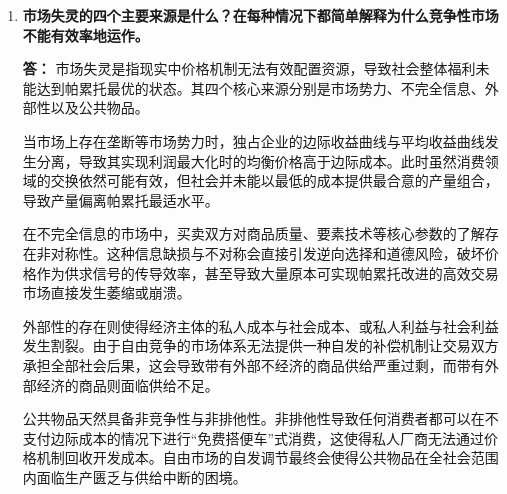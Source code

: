 \begin{enumerate}[label=\textbf{\arabic*.}, leftmargin=*]
		对于第四种陈述，表示不同意。生产 1 码布的机会成本是 3 蒲式耳小麦，意味着在劳动投入总量固定的约束下，多生产 1 码布所消耗的劳动力资源足以生产 3 蒲式耳小麦。因此，生产 1 码布所需的劳动投入在数值上应当是生产 1 蒲式耳小麦所需劳动投入的 3 倍。
		
		\item \textbf{市场失灵的四个主要来源是什么？在每种情况下都简单解释为什么竞争性市场不能有效率地运作。}
		
		\textbf{答：}
		市场失灵是指现实中价格机制无法有效配置资源，导致社会整体福利未能达到帕累托最优的状态。其四个核心来源分别是市场势力、不完全信息、外部性以及公共物品。
		
		当市场上存在垄断等市场势力时，独占企业的边际收益曲线与平均收益曲线发生分离，导致其实现利润最大化时的均衡价格高于边际成本。此时虽然消费领域的交换依然可能有效，但社会并未能以最低的成本提供最合意的产量组合，导致产量偏离帕累托最适水平。
		
		在不完全信息的市场中，买卖双方对商品质量、要素技术等核心参数的了解存在非对称性。这种信息缺损与不对称会直接引发逆向选择和道德风险，破坏价格作为供求信号的传导效率，甚至导致大量原本可实现帕累托改进的高效交易市场直接发生萎缩或崩溃。
		
		外部性的存在则使得经济主体的私人成本与社会成本、或私人利益与社会利益发生割裂。由于自由竞争的市场体系无法提供一种自发的补偿机制让交易双方承担全部社会后果，这会导致带有外部不经济的商品供给严重过剩，而带有外部经济的商品则面临供给不足。
		
		公共物品天然具备非竞争性与非排他性。非排他性导致任何消费者都可以在不支付边际成本的情况下进行“免费搭便车”式消费，这使得私人厂商无法通过价格机制回收开发成本。自由市场的自发调节最终会使得公共物品在全社会范围内面临生产匮乏与供给中断的困境。
	\end{enumerate}
	\newpage
